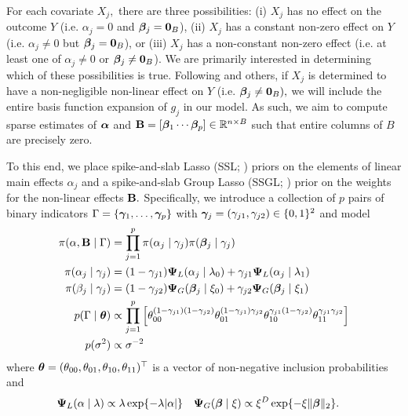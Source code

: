For each covariate $X_{j},$ there are three possibilities: (i) $X_{j}$ has no effect on the outcome $Y$ (i.e. $\alpha_{j} = 0$ and $\boldsymbol{\beta}_{j} = \mathbf{0}_{B}$), (ii) $X_{j}$ has a constant non-zero effect on $Y$ (i.e. $\alpha_{j} \neq 0$ but $\boldsymbol{\beta}_{j} = \mathbf{0}_{B}$), or (iii) $X_{j}$ has a non-constant non-zero effect (i.e. at least one of $\alpha_{j} \neq 0$ or $\boldsymbol{\beta}_{j} \neq \mathbf{0}_{B}$). 
We are primarily interested in determining which of these possibilities is true. 
Following \citet{Bai2020} and others, if $X_{j}$ is determined to have a non-negligible non-linear effect on $Y$ (i.e. $\boldsymbol{\beta}_{j} \neq \mathbf{0}_{B}),$ we will include the entire basis function expansion of $g_{j}$ in our model.
As such, we aim to compute sparse estimates of $\boldsymbol{\alpha}$ and $\mathbf{B} = [\boldsymbol{\beta}_{1} \cdots \boldsymbol{\beta}_{p}] \in \mathbb{R}^{n \times B}$ such that entire columns of $B$ are precisely zero.  

To this end, we place spike-and-slab Lasso (SSL; \citet{RockovaGeorge2018}) priors on the elements of linear main effects $\alpha_{j}$ and a spike-and-slab Group Lasso (SSGL; \citet{Bai2020}) prior on the weights for the non-linear effects $\mathbf{B}.$
Specifically, we introduce a collection of $p$ pairs of binary indicators $\Gamma = \{\boldsymbol{\gamma}_{1}, \ldots, \boldsymbol{\gamma}_{p}\}$ with $\boldsymbol{\gamma}_{j} = (\gamma_{j1}, \gamma_{j2}) \in \{0,1\}^{2}$ and model
\begin{align*}
\pi(\alpha, \mathbf{B} \mid \Gamma) &= \prod_{j = 1}^{p}{\pi(\alpha_{j} \mid \gamma_{j})\pi(\boldsymbol{\beta}_{j} \mid \gamma_{j})} \\
\pi(\alpha_{j} \mid \gamma_{j}) &= (1 - \gamma_{j1})\boldsymbol{\Psi}_{L}(\alpha_{j} \mid \lambda_{0}) + \gamma_{j1}\boldsymbol{\Psi}_{L}(\alpha_{j} \mid \lambda_{1}) \\
\pi(\beta_{j} \mid \gamma_{j}) &= (1 - \gamma_{j2})\boldsymbol{\Psi}_{G}(\boldsymbol{\beta}_{j} \mid \xi_{0}) + \gamma_{j2}\boldsymbol{\Psi}_{G}(\boldsymbol{\beta}_{j} \mid \xi_{1})\\
p(\Gamma \mid \boldsymbol{\theta}) &\propto \prod_{j = 1}^{p}{\left[\theta_{00}^{(1 - \gamma_{j1})(1 - \gamma_{j2})}\theta_{01}^{(1 - \gamma_{j1})\gamma_{j2}}\theta_{10}^{\gamma_{j1}(1 - \gamma_{j2})}\theta_{11}^{\gamma_{j1}\gamma_{j2}}\right]} \\
p(\sigma^{2}) &\propto \sigma^{-2}
\end{align*}
where $\boldsymbol{\theta} = (\theta_{00}, \theta_{01}, \theta_{10}, \theta_{11})^{\top}$ is a vector of non-negative inclusion probabilities and
\begin{align*}
\boldsymbol{\Psi}_{L}(\alpha \mid \lambda) &\propto \lambda\exp\{-\lambda\lvert\alpha\rvert\} & \boldsymbol{\Psi}_{G}(\boldsymbol{\beta} \mid \xi) &\propto \xi^{D}\exp\{-\xi\lVert \boldsymbol{\beta} \rVert_{2}\}.
\end{align*}


